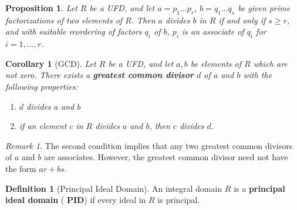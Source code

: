 \documentclass[12pt]{article}
\newtheorem{cor}[thm]{Corollary}
\newtheorem{prop}[thm]{Proposition}
\theoremstyle{definition}
\newtheorem{defn}[thm]{Definition}
\theoremstyle{remark}
\newtheorem{rmk}[thm]{Remark}
\numberwithin{equation}{section}
\newcommand\B[1]{\textbf{ #1}}
\begin{document}
\vspace{15pt}

\begin{prop}
        Let $R$ be a UFD, and let $a = p_1...p_r$, $b = q_1...q_s$ be given prime factorizations of two elements of $R$. Then $a$ divides $b$ in $R$ if and only if $s \geq r$, and with suitable reordering of factors $q_i$ of $b$, $p_i$ is an associate of $q_i$ for $i = 1,...,r$.
\end{prop}


\vspace{15pt}

\begin{cor}[GCD]
        Let $R$ be a UFD, and let $a,b$ be elements of $R$ which are not zero. There exists a \B{greatest common divisor} $d$ of $a$ and $b$ with the following properties:\begin{enumerate}
                \item $d$ divides $a$ and $b$
                \item if an element $c$ in $R$ divides $a$ and $b$, then $c$ divides $d$.
        \end{enumerate}
\end{cor}

\vspace{15pt}

\begin{rmk}
        The second condition implies that any two greatest common divisors of $a$ and $b$ are associates. However, the greatest common divisor need not have the form $ar + bs$.
\end{rmk}

\vspace{15pt}

\begin{defn}[Principal Ideal Domain]
        An integral domain $R$ is a \B{principal ideal domain} (\B{PID}) if every ideal in $R$ is principal.
\end{defn}

\vspace{15pt}
\end{document}
